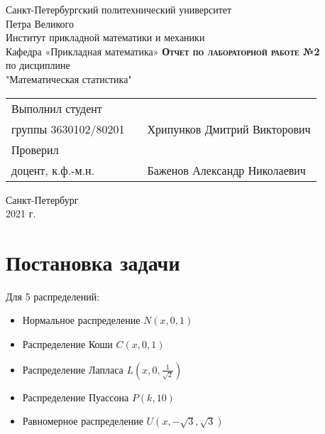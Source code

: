 \documentclass[12pt,a4paper]{article}
\begin{document}
    \begin{titlepage}
        \begin{center}
            \large
            Санкт-Петербургский политехнический университет\\Петра Великого\\
            \vspace{0.5cm}
            Институт прикладной математики и механики\\
            \vspace{0.25cm}
            Кафедра «Прикладная математика»
            \vfill
            \textsc{\LARGE\textbf{Отчет по лабораторной работе №2}}\\[5mm]
            \Large
            по дисциплине\\"Математическая статистика"
        \end{center}
        \vfill
        \begin{tabular}{l p{175pt} l}
            Выполнил студент \\ группы 3630102/80201 && Хрипунков Дмитрий Викторович
            \vspace{0.25cm}
            \\Проверил \\ доцент, к.ф.-м.н. && Баженов Александр Николаевич
        \end{tabular}
        \vfill
        \begin{center}
            Санкт-Петербург \\ 2021 г.
        \end{center}
    \end{titlepage}

\newpage
\begin{center}
    \tableofcontents
    \setcounter{page}{2}
\end{center}
\newpage
\begin{center}
    \listoftables
\end{center}

\newpage
\section{Постановка задачи}
Для 5 распределений:
\begin{itemize}
    \item Нормальное распределение $N(x,0,1)$
    \item Распределение Коши $C(x,0,1)$
    \item Распределение Лапласа $L(x,0,\frac{1}{\sqrt{2}})$
    \item Распределение Пуассона $P(k,10)$
    \item Равномерное распределение $U(x,-\sqrt{3},\sqrt{3})$
\end{itemize}
\end{document}
